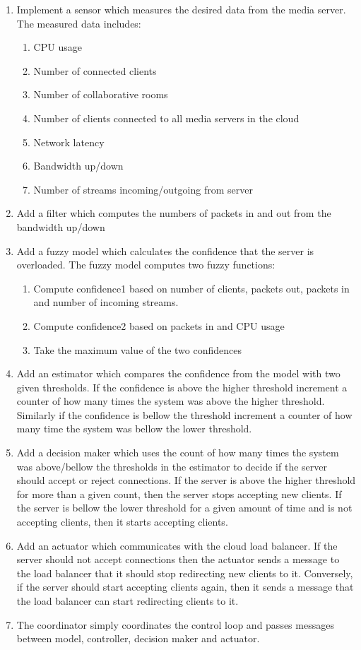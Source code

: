 \begin{enumerate}
	\item Implement a sensor which measures the desired data from the media server. The measured data includes:
	\begin{enumerate}
		\item CPU usage
		\item Number of connected clients
		\item Number of collaborative rooms
		\item Number of clients connected to all media servers in the cloud
		\item Network latency
		\item Bandwidth up/down
		\item Number of streams incoming/outgoing from server
	\end{enumerate}
	\item Add a filter which computes the numbers of packets in and out from the bandwidth up/down
	\item Add a fuzzy model which calculates the confidence that the server is overloaded. The fuzzy model computes two fuzzy functions:
	\begin{enumerate}
		\item Compute confidence1 based on number of clients, packets out, packets in and number of incoming streams.
		\item Compute confidence2 based on packets in and CPU usage
		\item Take the maximum value of the two confidences
	\end{enumerate}
	\item Add an estimator which compares the confidence from the model with two given thresholds. If the confidence is above the higher threshold increment a counter of how many times the system was above the higher threshold. Similarly if the confidence is bellow the threshold increment a counter of how many time the system was bellow the lower threshold.
	\item Add a decision maker which uses the count of how many times the system was above/bellow the thresholds in the estimator to decide if the server should accept or reject connections. If the server is above the higher threshold for more than a given count, then the server stops accepting new clients. If the server is bellow the lower threshold for a given amount of time and is not accepting clients, then it starts accepting clients.
	\item Add an actuator which communicates with the cloud load balancer. If the server should not accept connections then the actuator sends a message to the load balancer that it should stop redirecting new clients to it. Conversely, if the server should start accepting clients again, then it sends a message that the load balancer can start redirecting clients to it.
	\item The coordinator simply coordinates the control loop and passes messages between model, controller, decision maker and actuator.
\end{enumerate}

